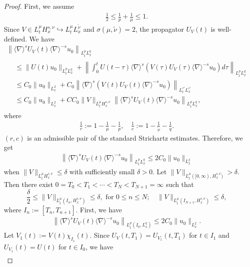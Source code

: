 \documentclass[AHL,Unicode,longabstracts,MathTools,published]{cedram}
\newcommand{\de}{\delta}
\newcommand{\ta}{\tau}
\newcommand{\si}{\sigma}
\newcommand{\ch}{\chi}
\newcommand{\wt}{\widetilde}
\newcommand{\K}[1]{\left(#1\right)}
\renewcommand{\No}[1]{\left\| #1 \right\|}
\newcommand{\I}{\infty}
\newcommand{\sd}{\langle \nabla \rangle}
\newcommand{\tw}{\frac{1}{2}}
\begin{document}
\begin{proof}
First, we assume
\begin{align}
\tw \le \frac{1}{p} + \frac{1}{\mu} \le 1.
\end{align}
Since $V \in L^\mu_t H^{s,\nu}_x \hookrightarrow L^\mu_t L^{\wt{\nu}}_x$ and $\si(\mu,\wt{\nu})=2$, the propagator $U_V(t)$ is well-defined. We have
\begin{multline}
\left\|\sd^s U_V(t)\sd^{-s}u_0\right\|_{L^p_t L^q_x}\\
\begin{aligned}
&\le \|U(t)u_0\|_{L^p_t L^q_x} + \No{\int_0^t U(t-\ta)\sd^s \left(V(\ta)U_V(\ta) \sd^{-s} u_0\right) d\ta}_{L^p_t L^q_x} \\
&\le C_0\|u_0\|_{L^2_x} + C_0\No{\sd^s \K{ V(t)U_V(t) \sd^{-s} u_0}}_{L^{r'}_t L^{c'}_x} \\
&\le C_0\|u_0\|_{L^2_x} + CC_0\|V\|_{L^\mu_t H^{s,\nu}_x} \left\|\sd^s U_V(t) \sd^{-s} u_0\right\|_{L^p_t L^q_x},
\end{aligned}
\end{multline}
where
\begin{align}
\frac{1}{r}:= 1-\frac{1}{\mu}-\frac{1}{p},
\quad \frac{1}{c} := 1 - \frac{1}{\wt{\nu}} - \frac{1}{q}.
\end{align}
$(r,c)$ is an admissible pair of the standard Strichartz estimates. Therefore, we get
\begin{align}
\left\|\sd^s U_V(t)\sd^{-s}u_0\right\|_{L^p_t L^q_x} \le 2C_0 \|u_0\|_{L^2_x}
\end{align}
when $\|V\|_{L^\mu_t H^{s,\nu}_x} \le \de$ with sufficiently small $\de>0$. Let $\|V\|_{L^\mu_t([0,\I),H^{s,\nu}_x)} > \de$. Then there exist $0=T_0 < T_1 < \cdots < T_N < T_{N+1} = \I$ such that
\begin{equation}\label{N}
\frac{\de}{2} \le \|V\|_{L^\mu_t\left(I_n, H^{s,\nu}_x\right)} \le \de, \text{ for } 0 \le n \le N; \quad
\|V\|_{L^\mu_t\left(I_{N+1}, H^{s,\nu}_x\right)} \le \de, 
\end{equation}
where $I_n := [T_n,T_{n+1}]$. First, we have
\begin{align}
\left\|\sd^sU_V(t)\sd^{-s} u_0\right\|_{L^p_t\left(I_0,L^q_x\right)}
\le 2C_0
\|u_0\|_{L^2_x}.
\end{align}
Let $V_1(t):= V(t) \ch_{I_1}(t)$. Since $U_V(t,T_1) = U_{V_1}(t,T_1)$ for $t \in I_1$ and $U_{V_1}(t) = U(t)$ for $t \in I_0$, we have
\begin{align}\label{UV ext}

\end{align}
\end{proof}
\end{document}
